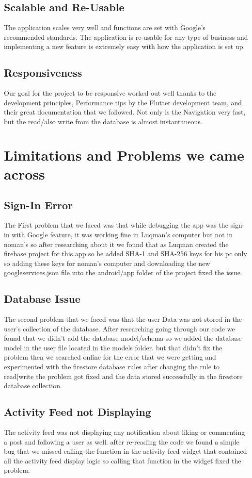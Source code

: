 \subsection{Scalable and Re-Usable}
The application scales very well and functions are set with Google's recommended
standards. The application is re-usable for any type of business and implementing a new feature is extremely easy with how the application is set up.
\subsection{Responsiveness}
Our goal for the project to be responsive worked out well thanks to the development principles, Performance tips by the Flutter development team, and their great documentation that we followed. Not only is the Navigation very fast, but the read/also write from the database is almost instantaneous.

\section{Limitations and Problems we came across}
\subsection{Sign-In Error}
The First problem that we faced was that while debugging the app was the sign-in with Google feature, it was working fine in Luqman's computer but not in noman's so after researching about it we found that as Luqman created the firebase project for this app so he added SHA-1 and SHA-256 keys for his pc only so adding these keys for noman's computer and downloading the new googleservices.json file into the android/app folder of the project fixed the issue.
\subsection{Database Issue}
The second problem that we faced was that the user Data was not stored in the user's collection of the database. After researching going through our code we found that we didn't add the database model/schema so we added the database model in the user file located in the models folder. but that didn't fix the problem then we searched online for the error that we were getting and experimented with the firestore database rules after changing the rule to read|write the problem got fixed and the data stored successfully in the firestore database collection.
\subsection{Activity Feed not Displaying}
The activity feed was not displaying any notification about liking or commenting a post and following a user as well. after re-reading the code we found a simple bug that we missed calling the function in the activity feed widget that contained all the activity feed display logic so calling that function in the widget fixed the problem.
